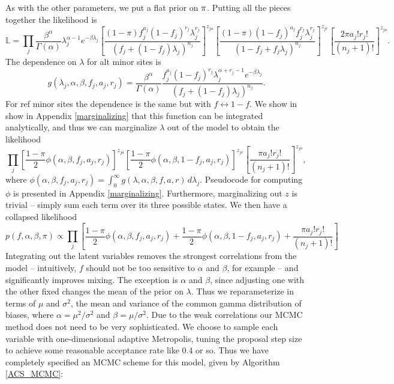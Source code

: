 \documentclass[nofootinbib,amssymb,amsmath]{revtex4}
\begin{document}
As with the other parameters, we put a flat prior on ${\rm \pi}$.  Putting all the pieces together the likelihood is
\begin{equation}
\mathbb{L} =\prod_j \frac{\beta^\alpha}{\Gamma(\alpha)} \lambda_j^{\alpha - 1} e^{-\beta \lambda_j}
\left[ \frac{(1-\pi) f_j^{a_j} (1 - f_j)^{r_j} \lambda_j^{r_j}}{ \left( f_j + (1-f_j) \lambda_j \right)^{n_j}} \right]^{z_{ja}}   
\left[ \frac{(1-\pi) (1-f_j)^{a_j} f_j^{r_j} \lambda_j^{r_j}}{ \left( 1 - f_j + f_j \lambda_j \right)^{n_j}} \right]^{z_{jr}}   
\left[ \frac{2 \pi a_j! r_j!}{(n_j + 1)!} \right]^{z_{jo}}.
\label{likelihood}
\end{equation}
%
The dependence on $\lambda$ for alt minor sites is
%
\begin{equation}
g(\lambda_j, \alpha, \beta, f_j, a_j, r_j) = \frac{\beta^\alpha}{\Gamma(\alpha)}  \frac{ f_j^{a_j} (1 - f_j)^{r_j}  \lambda_j^{\alpha + r_j - 1} e^{-\beta \lambda_j}}{ \left( f_j + (1-f_j) \lambda_j \right)^{n_j}}.
\end{equation}
For ref minor sites the dependence is the same but with $f \leftrightarrow 1 - f$.  We show in show in Appendix \ref{marginalizing} that this function can be integrated analytically, and thus we can marginalize $\lambda$ out of the model to obtain the likelihood
%
\begin{equation}
\prod_j 
\left[ \frac{1-\pi}{2} \phi(\alpha, \beta, f_j, a_j, r_j)  \right]^{z_{ja}}   
\left[ \frac{1-\pi}{2} \phi(\alpha, \beta, 1 - f_j, a_j, r_j)  \right]^{z_{jr}}   
\left[ \frac{ \pi a_j! r_j!}{(n_j + 1)!}  \right]^{z_{jo}},
\label{marginalized}
\end{equation}
%
where $\phi(\alpha, \beta, f_j, a_j, r_j) = \int_0^\infty g(\lambda, \alpha, \beta, f, a, r) \, d \lambda_j$.  Pseudocode for computing $\phi$ is presented in Appendix \ref{marginalizing}.  Furthermore, marginalizing out $z$ is trivial -- simply sum each term over its three possible states.  We then have a collapsed likelihood
%
\begin{equation}
p(f,\alpha, \beta, \pi) \propto \prod_j 
\left[    \frac{1-\pi}{2} \phi(\alpha, \beta, f_j, a_j, r_j)  +
\frac{1-\pi}{2} \phi(\alpha, \beta, 1 - f_j, a_j, r_j)  +
 \frac{ \pi a_j! r_j!}{(n_j + 1)!}    \right]
 \label{collapsed}
\end{equation}
%
Integrating out the latent variables removes the strongest correlations from the model -- intuitively, $f$ should not be too sensitive to $\alpha$ and $\beta$, for example -- and significantly improves mixing.  The exception is $\alpha$ and $\beta$, since adjusting one with the other fixed changes the mean of the prior on $\lambda$.  Thus we reparameterize in terms of $\mu$ and $\sigma^2$, the mean and variance of the common gamma distribution of biases, where $\alpha = \mu^2 / \sigma^2$ and $\beta = \mu / \sigma^2$.  Due to the weak correlations our MCMC method does not need to be very sophisticated.  We choose to sample each variable with one-dimensional adaptive Metropolis, tuning the proposal step size to achieve some reasonable acceptance rate like $0.4$ or so.  Thus we have completely specified an MCMC scheme for this model, given by Algorithm \ref{ACS_MCMC}:
\end{document}
